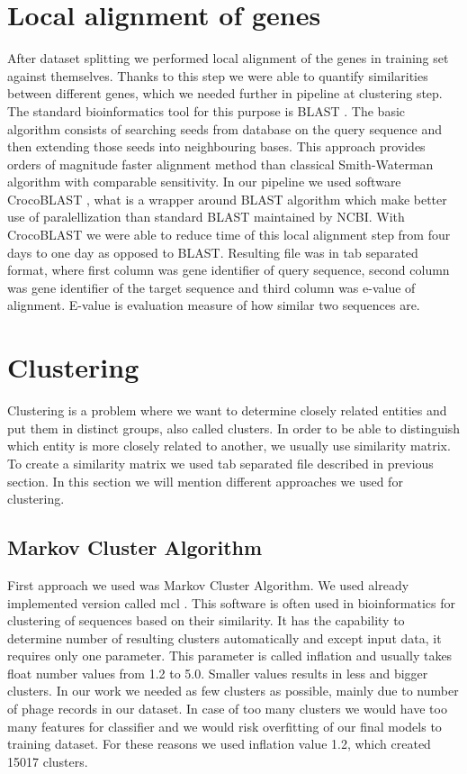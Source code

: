 \section{Local alignment of genes}
After dataset splitting we performed local alignment of the genes in training set against themselves.
Thanks to this step we were able to quantify similarities between different genes, which we needed further in pipeline at clustering step.
The standard bioinformatics tool for this purpose is BLAST \cite{blast}. 
The basic algorithm consists of searching seeds from database on the query sequence and then extending those seeds into neighbouring bases.
This approach provides orders of magnitude faster alignment method than classical Smith-Waterman algorithm \cite{smith_waterman} with comparable sensitivity.
In our pipeline we used software CrocoBLAST \cite{crocoblast}, what is a wrapper around BLAST algorithm which make better use of paralellization than standard BLAST maintained by NCBI.
With CrocoBLAST we were able to reduce time of this local alignment step from four days to one day as opposed to BLAST.
Resulting file was in tab separated format, where first column was gene identifier of query sequence, second column was gene identifier of the target sequence and third column was e-value of alignment. 
E-value is evaluation measure of how similar two sequences are.

\section{Clustering}
Clustering is a problem where we want to determine closely related entities and put them in distinct groups, also called clusters.
In order to be able to distinguish which entity is more closely related to another, we usually use similarity matrix.
To create a similarity matrix we used tab separated file described in previous section.
In this section we will mention different approaches we used for clustering. 
\subsection{Markov Cluster Algorithm}
First approach we used was Markov Cluster Algorithm. 
We used already implemented version called mcl \cite{mcl}.
This software is often used in bioinformatics for clustering of sequences based on their similarity.
It has the capability to determine number of resulting clusters automatically and except input data, it requires only one parameter.
This parameter is called inflation and usually takes float number values from 1.2 to 5.0.
Smaller values results in less and bigger clusters.
In our work we needed as few clusters as possible, mainly due to number of phage records in our dataset.
In case of too many clusters we would have too many features for classifier and we would risk overfitting of our final models to training dataset.
For these reasons we used inflation value 1.2, which created 15017 clusters.

